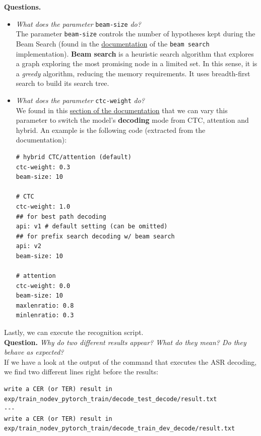 \documentclass[a4paper]{article}
\def\inline{\lstinline[basicstyle=\ttfamily,keywordstyle={}]}
\begin{document}
\textbf{Questions.}
\begin{itemize}
  \item \emph{What does the parameter} \inline{beam-size} \emph{do?}\\

        The parameter \inline{beam-size} controls the number of hypotheses kept during the Beam Search (found in the \href{https://espnet.github.io/espnet/_gen/espnet.nets.html?highlight=beam#espnet-nets-batch-beam-search}{documentation} of the \inline{beam search} implementation). \textbf{Beam search} is a heuristic search algorithm that explores a graph exploring the most promising node in a limited set. In this sense, it is a \emph{greedy} algorithm, reducing the memory requirements. It uses breadth-first search to build its search tree.

  \item \emph{What does the parameter} \inline{ctc-weight} \emph{do?}\\

        We found in this \href{https://espnet.github.io/espnet/tutorial.html?highlight=ctc%20weight#ctc-attention-and-hybrid-ctc-attention}{section of the documentation} that we can vary this parameter to switch the model's \textbf{decoding} mode from CTC, attention and hybrid. An example is the following code (extracted from the documentation):
        \begin{verbatim}
# hybrid CTC/attention (default)
ctc-weight: 0.3
beam-size: 10

# CTC
ctc-weight: 1.0
## for best path decoding
api: v1 # default setting (can be omitted)
## for prefix search decoding w/ beam search
api: v2
beam-size: 10

# attention
ctc-weight: 0.0
beam-size: 10
maxlenratio: 0.8
minlenratio: 0.3
  \end{verbatim}
\end{itemize}


Lastly, we can execute the recognition script.\\

\textbf{Question.} \emph{Why do two different results appear? What do they mean? Do they behave as expected?}\\
If we have a look at the output of the command that executes the ASR decoding, we find two different lines right before the results:
\begin{verbatim}
write a CER (or TER) result in exp/train_nodev_pytorch_train/decode_test_decode/result.txt
---
write a CER (or TER) result in exp/train_nodev_pytorch_train/decode_train_dev_decode/result.txt
\end{verbatim}
\end{document}
